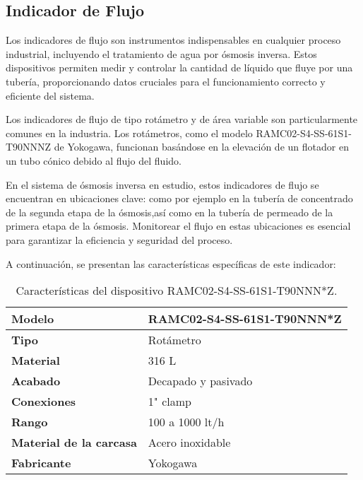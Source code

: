 \subsection{Indicador de Flujo} \label{sec:indicador_flujo}

Los indicadores de flujo son instrumentos indispensables en cualquier proceso industrial,
incluyendo el tratamiento de agua por ósmosis inversa. Estos dispositivos permiten medir
y controlar la cantidad de líquido que fluye por una tubería, proporcionando datos cruciales
para el funcionamiento correcto y eficiente del sistema.

Los indicadores de flujo de tipo rotámetro y de área variable son particularmente comunes
en la industria. Los rotámetros, como el modelo RAMC02-S4-SS-61S1-T90NNNZ de Yokogawa,
funcionan basándose en la elevación de un flotador en un tubo cónico debido al flujo del
fluido.

En el sistema de ósmosis inversa en estudio, estos indicadores de flujo se encuentran en
ubicaciones clave: como por ejemplo en la tubería de concentrado
de la segunda etapa de la ósmosis,así como en la tubería de permeado de la primera etapa de la ósmosis. Monitorear
el flujo en estas ubicaciones es esencial para garantizar la eficiencia y seguridad del
proceso.

A continuación, se presentan las características específicas de este indicador:\\



\begin{table}[H]
    \centering
    \caption{Características del dispositivo RAMC02-S4-SS-61S1-T90NNN*Z.}
    \label{table:indicador_flujo}
    \begin{tabular}{| L{6cm} | L{6cm} |}

        \hline
        \textbf{Modelo}                 & RAMC02-S4-SS-61S1-T90NNN*Z \\
        \hline
        \textbf{Tipo}                   & Rotámetro                  \\
        \hline
        \textbf{Material}               & 316 L                      \\
        \hline
        \textbf{Acabado}                & Decapado y pasivado        \\
        \hline
        \textbf{Conexiones}             & 1" clamp                   \\
        \hline
        \textbf{Rango}                  & 100 a 1000 lt/h            \\
        \hline
        \textbf{Material de la carcasa} & Acero inoxidable           \\
        \hline
        \textbf{Fabricante}             & Yokogawa                   \\
        \hline
    \end{tabular}
\end{table}

